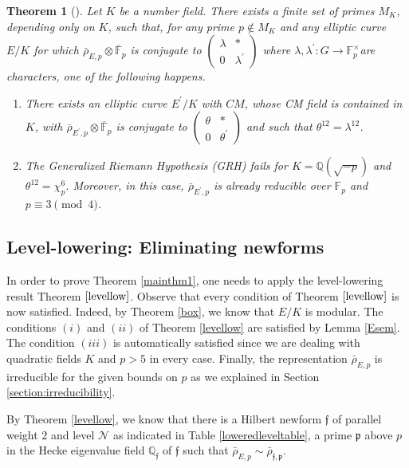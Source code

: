 \documentclass[]{article}
\newtheorem{theorem}{Theorem}
\newcommand {\QQ}{{\mathbb{Q}}}
\begin{document}
\begin{theorem}[{\cite[Theorem 1]{larson2014determinants}}]\label{thm: larson}
Let $K$ be a number field. There exists a finite set of primes $M_K$, depending only on $K$, such that, for any prime $p \notin M_K$ and any elliptic curve $E / K$ for which $\bar{\rho}_{E, p} \otimes \overline{\mathbb{F}}_p$ is conjugate to $\left(\begin{array}{cc}\lambda & * \\ 0 & \lambda^{\prime}\end{array}\right)$ where $\lambda, \lambda^{\prime}: G \rightarrow \mathbb{F}_p^{\times}$are characters, one of the following happens.
\begin{enumerate}
    \item There exists an elliptic curve $E^{\prime} / K$ with $C M$, whose CM field is contained in $K$, with $\bar{\rho}_{E^{\prime}, p} \otimes \overline{\mathbb{F}}_p$ is conjugate to $\left(\begin{array}{cc}\theta & * \\ 0 & \theta^{\prime}\end{array}\right)$ and such that $\theta^{12}=\lambda^{12}$.
    \item The Generalized Riemann Hypothesis (GRH) fails for $K=\mathbb{Q}(\sqrt{-p})$ and $\theta^{12}=\chi_p^6$. Moreover, in this case, $\bar{\rho}_{E^{\prime}, p}$ is already reducible over $\mathbb{F}_p$ and $p \equiv 3\pmod 4$.
\end{enumerate}
\end{theorem}

\subsection{Level-lowering: Eliminating newforms}\label{section:level-lowering}

In order to prove Theorem \ref{mainthm1}, one needs to apply the level-lowering result Theorem $\ref{levellow}$. Observe that every condition of Theorem $\ref{levellow}$ is now satisfied. Indeed, by Theorem \ref{box}, we know that $E/K$ is modular. The conditions $(i)$ and $(ii)$ of Theorem \ref{levellow} are satisfied by Lemma \ref{Esem}. The condition $(iii)$ is automatically satisfied since we are dealing with quadratic fields $K$ and $p>5$ in every case. Finally, the representation $\bar{\rho}_{E, p}$ is irreducible for the given bounds on $p$ as we explained in Section \ref{section:irreducibility}. 

By Theorem \ref{levellow}, we know that there is a Hilbert newform $\mathfrak{f}$ of parallel weight $2$ and level $\mathcal{N}$ as indicated in Table \ref{loweredleveltable}, a prime $\mathfrak{p}$ above $p$ in the Hecke eigenvalue field $\QQ_{\mathfrak{f}}$ of $\mathfrak{f}$ such that $\bar{\rho}_{E, p} \sim \bar{\rho}_{\mathfrak{f}, \mathfrak{p}}$.
\end{document}
